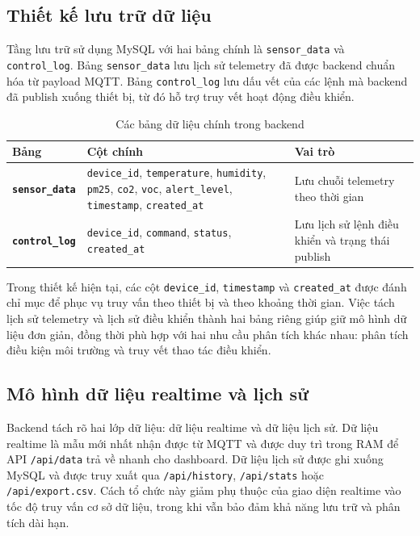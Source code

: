 \subsection{Thiết kế lưu trữ dữ liệu}

Tầng lưu trữ sử dụng MySQL với hai bảng chính là \texttt{sensor\_data} và
\texttt{control\_log}. Bảng \texttt{sensor\_data} lưu lịch sử telemetry đã được backend
chuẩn hóa từ payload MQTT. Bảng \texttt{control\_log} lưu dấu vết của các lệnh mà
backend đã publish xuống thiết bị, từ đó hỗ trợ truy vết hoạt động điều khiển.

\begin{table}[H]
    \centering
    \caption{Các bảng dữ liệu chính trong backend}
    \begin{tabularx}{\textwidth}{>{\bfseries}l X X}
        \toprule
        Bảng & Cột chính & Vai trò \\
        \midrule
        \texttt{sensor\_data} & \texttt{device\_id}, \texttt{temperature}, \texttt{humidity}, \texttt{pm25}, \texttt{co2}, \texttt{voc}, \texttt{alert\_level}, \texttt{timestamp}, \texttt{created\_at} & Lưu chuỗi telemetry theo thời gian \\
        \texttt{control\_log} & \texttt{device\_id}, \texttt{command}, \texttt{status}, \texttt{created\_at} & Lưu lịch sử lệnh điều khiển và trạng thái publish \\
        \bottomrule
    \end{tabularx}
\end{table}

Trong thiết kế hiện tại, các cột \texttt{device\_id}, \texttt{timestamp} và
\texttt{created\_at} được đánh chỉ mục để phục vụ truy vấn theo thiết bị và theo khoảng
thời gian. Việc tách lịch sử telemetry và lịch sử điều khiển thành hai bảng riêng giúp
giữ mô hình dữ liệu đơn giản, đồng thời phù hợp với hai nhu cầu phân tích khác nhau:
phân tích điều kiện môi trường và truy vết thao tác điều khiển.

\subsection{Mô hình dữ liệu realtime và lịch sử}

Backend tách rõ hai lớp dữ liệu: dữ liệu realtime và dữ liệu lịch sử. Dữ liệu realtime
là mẫu mới nhất nhận được từ MQTT và được duy trì trong RAM để API \texttt{/api/data}
trả về nhanh cho dashboard. Dữ liệu lịch sử được ghi xuống MySQL và được truy xuất qua
\texttt{/api/history}, \texttt{/api/stats} hoặc \texttt{/api/export.csv}. Cách tổ chức
này giảm phụ thuộc của giao diện realtime vào tốc độ truy vấn cơ sở dữ liệu, trong khi
vẫn bảo đảm khả năng lưu trữ và phân tích dài hạn.

